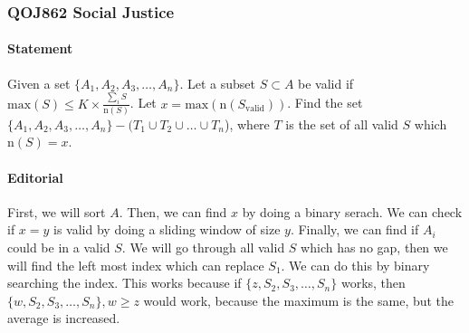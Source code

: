 \subsubsection{QOJ862 Social Justice}


\paragraph{Statement}
Given a set $\displaystyle \{A_1, A_2, A_3, \dots, A_n\}$.
Let a subset $\displaystyle S \subset A$ be valid if $\text{max}(S) \le K \times \frac{\sum_{i}{S}}{\text{n}(S)}$.
Let $x = \text{max}(\text{n}(S_{\text{valid}}))$.
Find the set $\{A_1, A_2, A_3, \dots, A_n\} - (T_1 \cup T_2 \cup \dots \cup T_n$), where $T$ is the set of all valid $S$ which $\text{n}(S) = x$.

\paragraph{Editorial}
First, we will sort $A$.
Then, we can find $x$ by doing a binary serach.
We can check if $x = y$ is valid by doing a sliding window of size $y$.
Finally, we can find if $A_i$ could be in a valid $S$.
We will go through all valid $S$ which has no gap, then we will find the left most index which can replace $S_1$.
We can do this by binary searching the index.
This works because if $\{z, S_2, S_3, \dots, S_n\}$ works, then $\{w, S_2, S_3, \dots, S_n\}, w \geq z$ would work, because the maximum is the same, but the average is increased.

